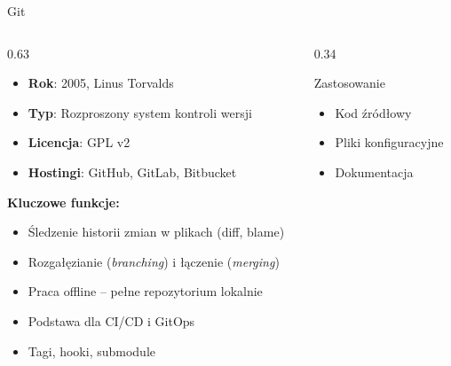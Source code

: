 \documentclass{beamer}
\begin{document}
\begin{frame}{Git}
    \begin{columns}[T]
        \begin{column}{0.63\textwidth}
            \begin{itemize}
                \item \textbf{Rok}: 2005, Linus Torvalds
                \item \textbf{Typ}: Rozproszony system kontroli wersji
                \item \textbf{Licencja}: GPL v2
                \item \textbf{Hostingi}: GitHub, GitLab, Bitbucket
            \end{itemize}
            \vspace{0.4em}
            \textbf{Kluczowe funkcje:}
            \begin{itemize}
                \item \'{S}ledzenie historii zmian w plikach (diff, blame)
                \item Rozga\l{}\k{e}zianie (\textit{branching}) i \l{}\k{a}czenie (\textit{merging})
                \item Praca offline -- pe\l{}ne repozytorium lokalnie
                \item Podstawa dla CI/CD i GitOps
                \item Tagi, hooki, submodule
            \end{itemize}
        \end{column}
        \begin{column}{0.34\textwidth}
            \begin{block}{Zastosowanie}
                \begin{itemize}
                    \item Kod \'zr\'od\l{}owy
                    \item Pliki konfiguracyjne
                    \item Dokumentacja
                \end{itemize}
            \end{block}
        \end{column}
    \end{columns}
\end{frame}
\end{document}
